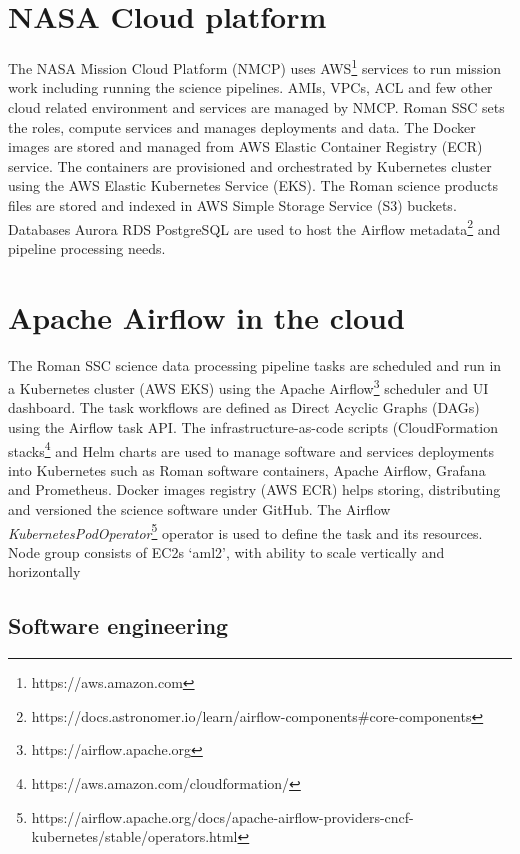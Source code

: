 \documentclass[11pt,twoside]{article}
\begin{document}
\section{NASA Cloud platform}

The NASA Mission Cloud Platform (NMCP) uses AWS\footnote{https://aws.amazon.com} services to run mission work including running the science pipelines. AMIs, VPCs, ACL and few other cloud related environment and services are managed by NMCP. Roman SSC sets the roles, compute services and manages deployments and data. The Docker images are stored and managed from AWS Elastic Container Registry (ECR) service.
The containers are provisioned and orchestrated by Kubernetes cluster using the AWS Elastic Kubernetes Service (EKS).
The Roman science products files are stored and indexed in AWS Simple Storage Service (S3) buckets.
Databases Aurora RDS PostgreSQL are used to host the Airflow metadata\footnote{https://docs.astronomer.io/learn/airflow-components\#core-components} and pipeline processing needs.

\section{Apache Airflow in the cloud}

The Roman SSC science data processing pipeline tasks are scheduled and run in a Kubernetes cluster (AWS EKS) using the Apache Airflow\footnote{https://airflow.apache.org} scheduler and UI dashboard. The task workflows are defined as Direct Acyclic Graphs (DAGs) using the Airflow task API. The infrastructure-as-code scripts (CloudFormation stacks\footnote{https://aws.amazon.com/cloudformation/} and Helm charts are used to manage software and services deployments into Kubernetes such as Roman software containers, Apache Airflow, Grafana and Prometheus.
Docker images registry (AWS ECR) helps storing, distributing and versioned the science software under GitHub.
The Airflow \emph{KubernetesPodOperator}\footnote{https://airflow.apache.org/docs/apache-airflow-providers-cncf-kubernetes/stable/operators.html} operator is used to define the task and its resources.
Node group consists of EC2s ‘aml2’, with ability to scale vertically and horizontally

\subsection{Software engineering}
\end{document}

